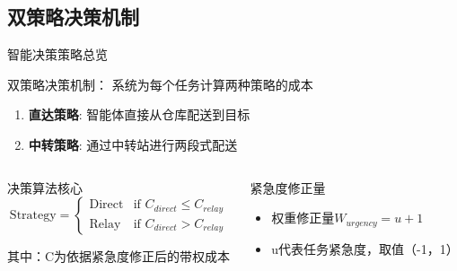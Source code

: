 \documentclass[
10pt,
aspectratio=169,
]{beamer}
\begin{document}
\subsection{双策略决策机制}

\begin{frame}{智能决策策略总览}
    \begin{block}{双策略决策机制：        系统为每个任务计算两种策略的成本}

        \begin{enumerate}
            \item \textbf{直达策略}: 智能体直接从仓库配送到目标
            \item \textbf{中转策略}: 通过中转站进行两段式配送
        \end{enumerate}
    \end{block}
    
    \begin{columns}
        \begin{column}{0.5\textwidth}
            \begin{alertblock}{决策算法核心}
                \begin{equation}
                \text{Strategy} = \begin{cases}
                \text{Direct} & \text{if } C_{direct} \leq C_{relay} \\
                \text{Relay} & \text{if } C_{direct} > C_{relay}
                \end{cases}
                \end{equation}
                
                其中：C为依据紧急度修正后的带权成本
            \end{alertblock}
        \end{column}
        \begin{column}{0.5\textwidth}
            \begin{exampleblock}{紧急度修正量}
                \begin{itemize}
			
                    \item $权重修正量W_{urgency}=u+1$ 
				\item u代表任务紧急度，取值（-1，1）
				
                    
                \end{itemize}
            \end{exampleblock}
        \end{column}
    \end{columns}
\end{frame}
\end{document}
